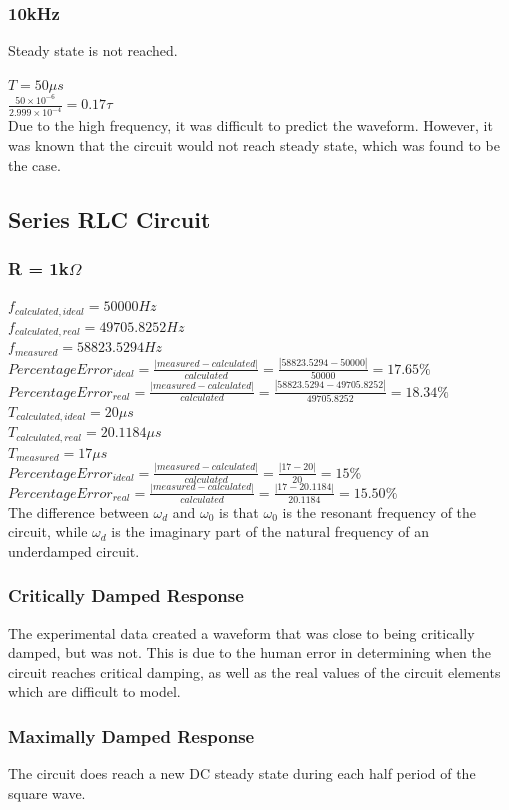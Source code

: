 \documentclass[10pt]{article}
\begin{document}
\subsubsection*{10kHz}
\noindent Steady state is not reached.

$T = 50\mu s$\\
$\frac{50\times10^{-6}}{2.999\times10^{-4}} = 0.17\tau$\\
\noindent Due to the high frequency, it was difficult to predict the waveform. However, it was known that the circuit would not reach steady state, which was found to be the case.

\subsection*{Series RLC Circuit}
\subsubsection*{R = 1k$\Omega$}
$f_{calculated,ideal} = 50000 Hz$\\
$f_{calculated,real} = 49705.8252 Hz$\\
$f_{measured} = 58823.5294 Hz$\\
$Percentage Error_{ideal} = \frac{|measured-calculated|}{calculated} = \frac{|58823.5294-50000|}{50000} = 17.65\%$\\
$Percentage Error_{real} = \frac{|measured-calculated|}{calculated} = \frac{|58823.5294-49705.8252|}{49705.8252} = 18.34\%$\\
$T_{calculated,ideal} = 20\mu s$\\
$T_{calculated,real} = 20.1184\mu s$\\
$T_{measured} = 17\mu s$\\
$Percentage Error_{ideal} = \frac{|measured-calculated|}{calculated} = \frac{|17-20|}{20} = 15\%$\\
$Percentage Error_{real} = \frac{|measured-calculated|}{calculated} = \frac{|17-20.1184|}{20.1184} = 15.50\%$\\
\noindent The difference between $\omega_d$ and $\omega_0$ is that $\omega_0$ is the resonant frequency of the circuit, while $\omega_d$ is the imaginary part of the natural frequency of an underdamped circuit.

\subsubsection*{Critically Damped Response}
The experimental data created a waveform that was close to being critically damped, but was not. This is due to the human error in determining when the circuit reaches critical damping, as well as the real values of the circuit elements which are difficult to model.

\subsubsection*{Maximally Damped Response}
\noindent The circuit does reach a new DC steady state during each half period of the square wave.
\end{document}
